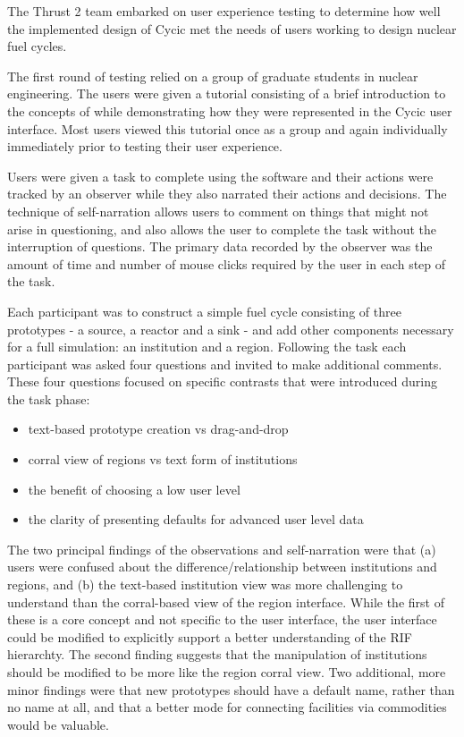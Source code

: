 The Thrust 2 team embarked on user experience testing to determine how well
the implemented design of Cycic met the needs of users working to design
nuclear fuel cycles.

The first round of testing relied on a group of graduate students in nuclear
engineering.  The users were given a tutorial consisting of a brief
introduction to the concepts of \Cyclus while demonstrating how they were
represented in the Cycic user interface.  Most users viewed this tutorial once
as a group and again individually immediately prior to testing their user
experience.

Users were given a task to complete using the software and their actions were
tracked by an observer while they also narrated their actions and decisions.
The technique of self-narration allows users to comment on things that might
not arise in questioning, and also allows the user to complete the task
without the interruption of questions.  The primary data recorded by the
observer was the amount of time and number of mouse clicks required by the
user in each step of the task.

Each participant was to construct a simple fuel cycle consisting of three
prototypes - a source, a reactor and a sink - and add other components
necessary for a full \Cyclus simulation: an institution and a region.
Following the task each participant was asked four questions and invited to
make additional comments.  These four questions focused on specific contrasts
that were introduced during the task phase:
\begin{itemize}
\item text-based prototype creation vs drag-and-drop
\item corral view of regions vs text form of institutions
\item the benefit of choosing a low user level
\item the clarity of presenting defaults for advanced user level data
\end{itemize}

The two principal findings of the observations and self-narration were that
(a) users were confused about the difference/relationship between institutions
and regions, and (b) the text-based institution view was more challenging to
understand than the corral-based view of the region interface.  While the
first of these is a core \Cyclus concept and not specific to the user
interface, the user interface could be modified to explicitly support a better
understanding of the \gls{RIF} hierarchty.  The second finding suggests that
the manipulation of institutions should be modified to be more like the region
corral view. Two additional, more minor findings were that new prototypes
should have a default name, rather than no name at all, and that a better mode
for connecting facilities via commodities would be valuable.

